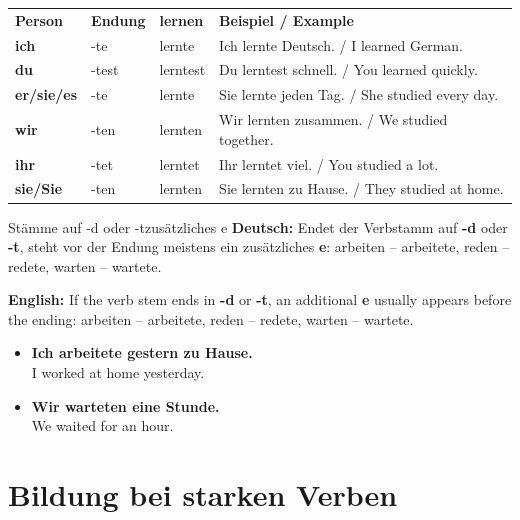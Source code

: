 \documentclass[a4paper,11pt]{article}
\newcommand{\GermanText}[1]{\textbf{Deutsch: }#1\par}
\newcommand{\EnglishText}[1]{{\small\color{SoftGray}\textbf{English: }#1\par}}
\newcommand{\ExampleItem}[2]{\item \textbf{#1}\\{\small\color{SoftGray}#2}}
\begin{document}
        \begin{longtable}{>{\bfseries}p{2.5cm}|p{3cm}|p{3cm}|p{5.2cm}}
            \rowcolor{HeaderBlueDark}
            \color{white}\textbf{Person} &
            \color{white}\textbf{Endung} &
            \color{white}\textbf{lernen} &
            \color{white}\textbf{Beispiel / Example} \\
            ich & -te & lernte & Ich lernte Deutsch. / I learned German. \\
            du & -test & lerntest & Du lerntest schnell. / You learned quickly. \\
            er/sie/es & -te & lernte & Sie lernte jeden Tag. / She studied every day. \\
            wir & -ten & lernten & Wir lernten zusammen. / We studied together. \\
            ihr & -tet & lerntet & Ihr lerntet viel. / You studied a lot. \\
            sie/Sie & -ten & lernten & Sie lernten zu Hause. / They studied at home. \\
        \end{longtable}
        
        \begin{grammarentry}{Stämme auf -d oder -t}{zusätzliches e}
            \GermanText{Endet der Verbstamm auf \textbf{-d} oder \textbf{-t}, steht vor der Endung meistens ein zusätzliches \textbf{e}: arbeiten -- arbeitete, reden -- redete, warten -- wartete.}
            \EnglishText{If the verb stem ends in \textbf{-d} or \textbf{-t}, an additional \textbf{e} usually appears before the ending: arbeiten -- arbeitete, reden -- redete, warten -- wartete.}
        \end{grammarentry}
        
        \begin{exbox}
            \begin{itemize}
                \ExampleItem{Ich arbeitete gestern zu Hause.}{I worked at home yesterday.}
                \ExampleItem{Wir warteten eine Stunde.}{We waited for an hour.}
            \end{itemize}
        \end{exbox}
    
    
    \section{Bildung bei starken Verben}
        
\end{document}
